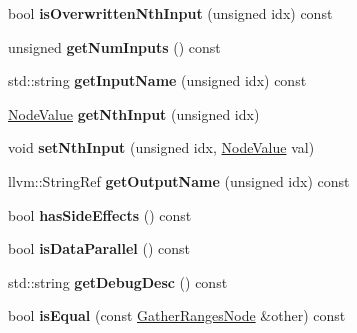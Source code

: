 \begin{DoxyCompactItemize}
bool {\bfseries is\+Overwritten\+Nth\+Input} (unsigned idx) const
\item 
\mbox{\label{classglow_1_1_gather_ranges_node_ab390793b04ba6e77b3e30effa42410db}} 
unsigned {\bfseries get\+Num\+Inputs} () const
\item 
\mbox{\label{classglow_1_1_gather_ranges_node_ae7d83c94a92dc6d5ec8e33bd72650704}} 
std\+::string {\bfseries get\+Input\+Name} (unsigned idx) const
\item 
\mbox{\label{classglow_1_1_gather_ranges_node_a7d108b8830f88540c11583a15b30eaed}} 
\hyperlink{structglow_1_1_node_value}{Node\+Value} {\bfseries get\+Nth\+Input} (unsigned idx)
\item 
\mbox{\label{classglow_1_1_gather_ranges_node_ac4577c6d9f8c5fc9b58a1687ba83f7af}} 
void {\bfseries set\+Nth\+Input} (unsigned idx, \hyperlink{structglow_1_1_node_value}{Node\+Value} val)
\item 
\mbox{\label{classglow_1_1_gather_ranges_node_a2b05ee65a76281ac1e7c101667a24350}} 
llvm\+::\+String\+Ref {\bfseries get\+Output\+Name} (unsigned idx) const
\item 
\mbox{\label{classglow_1_1_gather_ranges_node_a71b6d04258e553089d389c8aff5f977f}} 
bool {\bfseries has\+Side\+Effects} () const
\item 
\mbox{\label{classglow_1_1_gather_ranges_node_af7da90298b9c0454ce1ede3fda5de90a}} 
bool {\bfseries is\+Data\+Parallel} () const
\item 
\mbox{\label{classglow_1_1_gather_ranges_node_a12090b044b60e987da33772b6a959258}} 
std\+::string {\bfseries get\+Debug\+Desc} () const
\item 
\mbox{\label{classglow_1_1_gather_ranges_node_a2784bb641e7b3f8952a3fc4c7628e2ec}} 
bool {\bfseries is\+Equal} (const \hyperlink{classglow_1_1_gather_ranges_node}{Gather\+Ranges\+Node} \&other) const
\item 

\end{DoxyCompactItemize}
